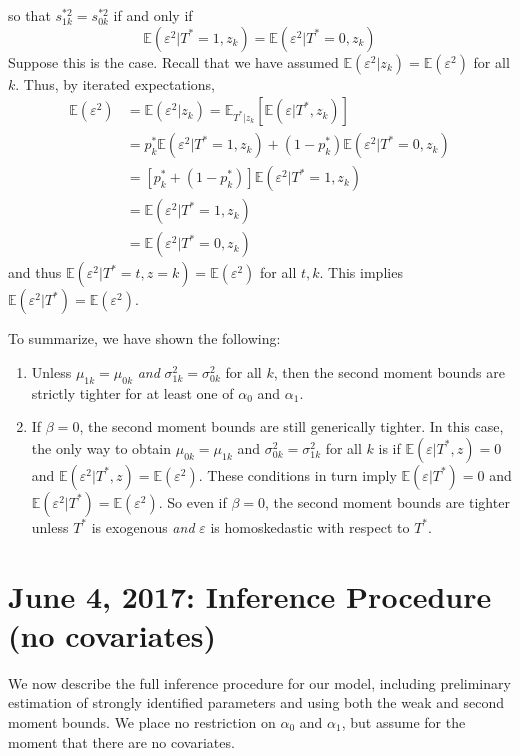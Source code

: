 \documentclass[12pt]{article}
\begin{document}
so that $s_{1k}^{*2} = s_{0k}^{*2}$ if and only if 
\[
   \mathbb{E}(\varepsilon^2|T^*=1,z_k) = \mathbb{E}(\varepsilon^2|T^*=0,z_k)
\]
Suppose this is the case.
Recall that we have assumed $\mathbb{E}\left( \varepsilon^2|z_k \right) = \mathbb{E}(\varepsilon^2)$ for all $k$.
Thus, by iterated expectations,
\begin{align*}
  \mathbb{E}(\varepsilon^2) &= \mathbb{E}\left( \varepsilon^2|z_k \right) = \mathbb{E}_{T^*|z_k}\left[ \mathbb{E}\left( \varepsilon|T^*,z_k \right) \right]\\
  &= p_k^* \mathbb{E}\left( \varepsilon^2|T^*=1, z_k \right) + (1 - p_k^*) \mathbb{E}\left( \varepsilon^2|T^*=0, z_k \right)\\
  &= \left[p_k^* + (1 - p_k^*)\right] \mathbb{E}\left( \varepsilon^2|T^*=1, z_k \right)\\
  &= \mathbb{E}\left( \varepsilon^2|T^*=1, z_k \right)\\
  &= \mathbb{E}\left( \varepsilon^2|T^*=0, z_k \right)
\end{align*}
and thus $\mathbb{E}(\varepsilon^2|T^*=t,z=k)=\mathbb{E}(\varepsilon^2)$ for all $t,k$.
This implies $\mathbb{E}(\varepsilon^2|T^*)=\mathbb{E}(\varepsilon^2)$.

To summarize, we have shown the following:
\begin{enumerate}
  \item Unless $\mu_{1k} = \mu_{0k}$ \emph{and} $\sigma_{1k}^2 = \sigma^2_{0k}$ for all $k$, then the second moment bounds are strictly tighter for at least one of $\alpha_0$ and $\alpha_1$.
  \item If $\beta = 0$, the second moment bounds are still generically tighter.
    In this case, the only way to obtain $\mu_{0k} = \mu_{1k}$ and $\sigma_{0k}^2 = \sigma_{1k}^2$ for all $k$ is if $\mathbb{E}(\varepsilon|T^*,z)=0$ and $\mathbb{E}(\varepsilon^2|T^*,z) = \mathbb{E}(\varepsilon^2)$.
    These conditions in turn imply $\mathbb{E}(\varepsilon|T^*)=0$ and $\mathbb{E}(\varepsilon^2|T^*) = \mathbb{E}(\varepsilon^2)$.
    So even if $\beta = 0$, the second moment bounds are tighter unless $T^*$ is exogenous \emph{and} $\varepsilon$ is homoskedastic with respect to $T^*$.
\end{enumerate}

\section{June 4, 2017: Inference Procedure (no covariates)}
We now describe the full inference procedure for our model, including preliminary estimation of strongly identified parameters and using both the weak and second moment bounds.
We place no restriction on $\alpha_0$ and $\alpha_1$, but assume for the moment that there are no covariates.
\end{document}
